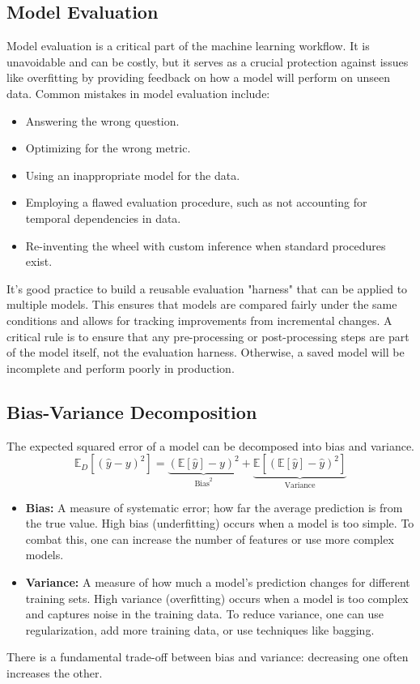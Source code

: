 \documentclass{article}
\begin{document}
\begin{multicols}{2}
	\section{Model Evaluation}
	Model evaluation is a critical part of the machine learning workflow. It is unavoidable and can be costly, but it serves as a crucial protection against issues like overfitting by providing feedback on how a model will perform on unseen data. Common mistakes in model evaluation include:
	\begin{itemize}
		\item Answering the wrong question.
		\item Optimizing for the wrong metric.
		\item Using an inappropriate model for the data.
		\item Employing a flawed evaluation procedure, such as not accounting for temporal dependencies in data.
		\item Re-inventing the wheel with custom inference when standard procedures exist.
	\end{itemize}

	It's good practice to build a reusable evaluation "harness" that can be applied to multiple models. This ensures that models are compared fairly under the same conditions and allows for tracking improvements from incremental changes.
	A critical rule is to ensure that any pre-processing or post-processing steps are part of the model itself, not the evaluation harness. Otherwise, a saved model will be incomplete and perform poorly in production.

	\subsection{Bias-Variance Decomposition}
	The expected squared error of a model can be decomposed into bias and variance.
	$$ \mathbb{E}_{D}[(\hat{y} - y)^2] = \underbrace{(\mathbb{E}[\hat{y}] - y)^2}_{\text{Bias}^2} + \underbrace{\mathbb{E}[(\mathbb{E}[\hat{y}] - \hat{y})^2]}_{\text{Variance}} $$
	\begin{itemize}
		\item \textbf{Bias:} A measure of systematic error; how far the average prediction is from the true value. High bias (underfitting) occurs when a model is too simple. To combat this, one can increase the number of features or use more complex models.
		\item \textbf{Variance:} A measure of how much a model's prediction changes for different training sets. High variance (overfitting) occurs when a model is too complex and captures noise in the training data. To reduce variance, one can use regularization, add more training data, or use techniques like bagging.
	\end{itemize}
	There is a fundamental trade-off between bias and variance: decreasing one often increases the other.


\end{multicols}
\end{document}
